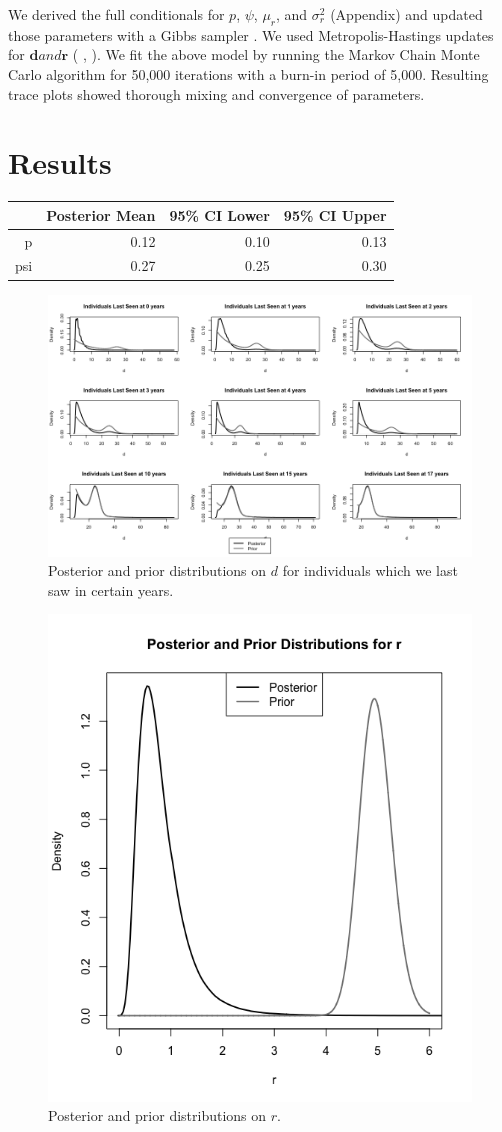 \documentclass[12pt, a4paper]{article}
\newcommand{\citeay}[1]{\citeauthor{#1} \citeyear{#1}}
\begin{document}
We derived the full conditionals for $p$, $\psi$, $\mu_r$, and $\sigma_r^2$ (Appendix) and updated those parameters with a Gibbs sampler \citep{Geman1984}. We used Metropolis-Hastings updates for $\mathbf{d} and \mathbf{r}$ (\citeay{Metropolis1953}, \citeay{Hastings1970}). We fit the above model by running the Markov Chain Monte Carlo algorithm for 50,000 iterations with a burn-in period of 5,000. Resulting trace plots showed thorough mixing and convergence of parameters. 

\section{Results}

\begin{table}[ht]
\centering
\begin{tabular}{rrrr}
  \hline
   & Posterior Mean & 95\% CI Lower & 95\% CI Upper \\ 
  \hline
  p & 0.12 & 0.10 & 0.13 \\ 
  psi & 0.27 & 0.25 & 0.30 \\ 
   \hline
\end{tabular}
\end{table}

\begin{figure}[h]
\centering
\includegraphics[width = \textwidth]{Posterior_d.png}
\caption{Posterior and prior distributions on $d$ for individuals which we last saw in certain years.}
\end{figure}

\begin{figure}[h]
\centering
\includegraphics[width = .4\textwidth]{Posterior_r.png}
\caption{Posterior and prior distributions on $r$.}
\end{figure}
\end{document}
